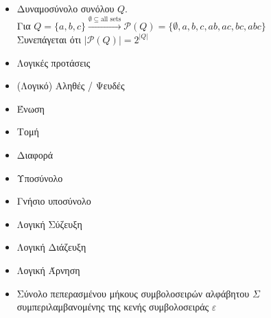\begin{itemize}
	\item{ Δυναμοσύνολο συνόλου $Q$.\\
		\makebox[2.15cm]{\hfill}Για $Q = \{a, b, c\} \overset{\emptyset \subseteq \text{all sets}}{\rightarrow}
		\mathcal{P}(Q) = \{\emptyset, a, b, c, ab, ac, bc, 	abc\}$\\
		\makebox[2.14cm]{\hfill}Συνεπάγεται ότι $\vert\mathcal{P}(Q)\vert = 2^{\vert Q\vert}$}
	\item{ Λογικές προτάσεις}
	\item{ (Λογικό) Αληθές / Ψευδές}
	\item{\makebox[2cm]{$\cup$ \hfill} Ένωση}
	\item{\makebox[2cm]{$\cap$ \hfill} Τομή}
	\item{ Διαφορά}
	\item{\makebox[2cm]{$\subseteq$ \hfill} Υποσύνολο}
	\item{\makebox[2cm]{$\subset$ \hfill} Γνήσιο υποσύνολο}
	\item{\makebox[2cm]{$\land$ \hfill} Λογική Σύζευξη}
	\item{\makebox[2cm]{$\lor$ \hfill} Λογική Διάζευξη}
	\item{\makebox[2cm]{$\neg{}$ \hfill} Λογική Άρνηση}
	\item{\makebox[2cm]{$\Sigma^*$ \hfill} Σύνολο πεπερασμένου μήκους συμβολοσειρών αλφάβητου $\Sigma$\\
		 \makebox[2.15cm]{\hfill}συμπεριλαμβανομένης της κενής συμβολοσειράς $ε$}
\end{itemize}

\clearpage